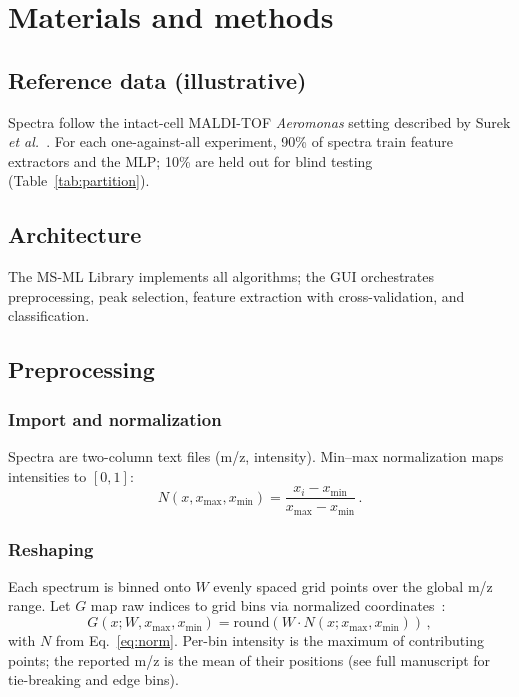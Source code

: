 \documentclass[preprint,12pt]{elsarticle}
\begin{document}
\section{Materials and methods}
\label{sec:methods}

\subsection{Reference data (illustrative)}
Spectra follow the intact-cell MALDI-TOF \textit{Aeromonas} setting described by Surek \textit{et al.}~\cite{Surek2010}. For each one-against-all experiment, 90\% of spectra train feature extractors and the MLP; 10\% are held out for blind testing (Table~\ref{tab:partition}).

\subsection{Architecture}
The MS-ML Library implements all algorithms; the GUI orchestrates preprocessing, peak selection, feature extraction with cross-validation, and classification.

\subsection{Preprocessing}

\subsubsection{Import and normalization}
Spectra are two-column text files (m/z, intensity). Min--max normalization maps intensities to $[0,1]$:
\begin{equation}
N(x, x_{\max}, x_{\min}) = \frac{x_i - x_{\min}}{x_{\max} - x_{\min}}\,.
\label{eq:norm}
\end{equation}

\subsubsection{Reshaping}
Each spectrum is binned onto $W$ evenly spaced grid points over the global m/z range. Let $G$ map raw indices to grid bins via normalized coordinates~\cite{Liu2013}:
\begin{equation}
G(x; W, x_{\max}, x_{\min}) = \mathrm{round}\left(W \cdot N(x; x_{\max}, x_{\min})\right)\,,
\label{eq:reshape}
\end{equation}
with $N$ from Eq.~\eqref{eq:norm}. Per-bin intensity is the maximum of contributing points; the reported m/z is the mean of their positions (see full manuscript for tie-breaking and edge bins).
\end{document}
